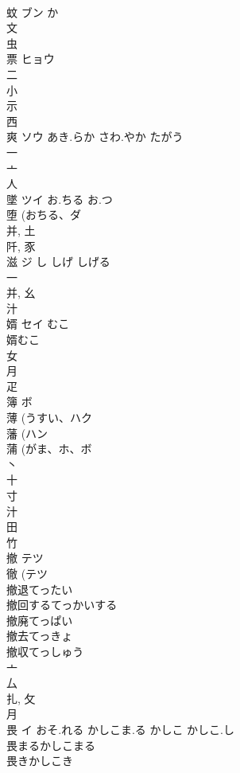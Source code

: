 \documentclass[8pt]{extreport}
\begin{document}
\begin{CJK}{UTF8}{min}
\\	蚊	ブン	か	
\\	文 
\\	虫 
\\	票	ヒョウ		
\\	二 
\\	小 
\\	示 
\\	西 
\\	爽	ソウ	あき.らか さわ.やか たがう	
\\	一 
\\	亠 
\\	人 
\\	墜	ツイ	お.ちる お.つ	
\\	堕 (おちる、ダ 
\\	并, 土 
\\	阡, 豕 
\\	滋	ジ	し しげ しげる	
\\	一 
\\	并, 幺 
\\	汁 
\\	婿	セイ	むこ	
\\	婿むこ 
\\	女 
\\	月 
\\	疋 
\\	簿	ボ		
\\	薄 (うすい、ハク 
\\	藩 (ハン 
\\	蒲 (がま、ホ、ボ 
\\	丶 
\\	十 
\\	寸 
\\	汁 
\\	田 
\\	竹 
\\	撤	テツ		
\\	徹 (テツ 
\\	撤退てったい 
\\	撤回するてっかいする 
\\	撤廃てっぱい 
\\	撤去てっきょ 
\\	撤収てっしゅう 
\\	亠 
\\	厶 
\\	扎, 攵 
\\	月 
\\	畏	イ	おそ.れる かしこま.る かしこ かしこ.し	
\\	畏まるかしこまる 
\\	畏きかしこき 

\end{CJK}
\end{document}

